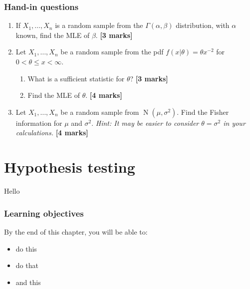 \documentclass[
]{book}
\providecommand{\tightlist}{%
  \setlength{\itemsep}{0pt}\setlength{\parskip}{0pt}}
\DeclareMathOperator{\N}{N}
\theoremstyle{definition}
\theoremstyle{definition}
\theoremstyle{definition}
\theoremstyle{definition}
\theoremstyle{remark}
\begin{document}
\hypertarget{hand-in-questions-3}{%
\subsection*{Hand-in questions}\label{hand-in-questions-3}}

\begin{enumerate}
\def\labelenumi{\arabic{enumi}.}
\item
  If \(X_1,\dots,X_n\) is a random sample from the \(\Gamma(\alpha,\beta)\) distribution, with \(\alpha\) known, find the MLE of \(\beta\). \textbf{{[}3 marks{]}}
\item
  Let \(X_1,\dots,X_n\) be a random sample from the pdf \(f(x|\theta)=\theta x^{-2}\) for \(0 < \theta \leq x < \infty\).

  \begin{enumerate}
  \def\labelenumii{(\alph{enumii})}
  \item
    What is a sufficient statistic for \(\theta\)? \textbf{{[}3 marks{]}}
  \item
    Find the MLE of \(\theta\). \textbf{{[}4 marks{]}}
  \end{enumerate}
\item
  Let \(X_1,\dots,X_n\) be a random sample from \(\N(\mu,\sigma^2)\). Find the Fisher information for \(\mu\) and \(\sigma^2\). \emph{Hint: It may be easier to consider \(\theta=\sigma^2\) in your calculations.} \textbf{{[}4 marks{]}}
\end{enumerate}

\hypertarget{hypothesis-testing}{%
\chapter{Hypothesis testing}\label{hypothesis-testing}}

Hello

\hypertarget{learning-objectives-4}{%
\subsection*{Learning objectives}\label{learning-objectives-4}}

By the end of this chapter, you will be able to:

\begin{itemize}
\tightlist
\item
  do this
\item
  do that
\item
  and this
\end{itemize}
\end{document}
